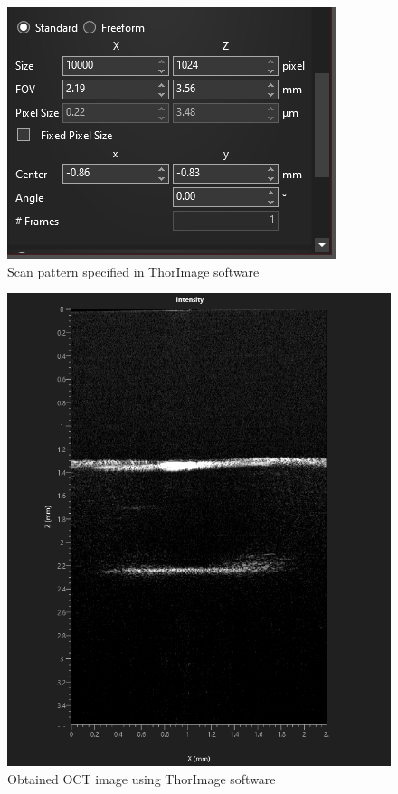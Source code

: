 \begin{figure}[H]\label{fig4.5}
\centering \includegraphics[scale=0.5]{Images/ScanPattern_ThorImage1.PNG}
\caption{Scan pattern specified in ThorImage software}
\end{figure}

\begin{figure}[H]\label{fig4.6}
\centering \includegraphics[scale=0.25]{Images/OCT_Image_ThorImage.PNG}
\caption{Obtained OCT image using ThorImage software}
\end{figure}

